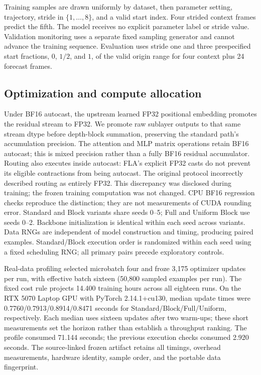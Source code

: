 Training samples are drawn uniformly by dataset, then parameter setting, trajectory, stride in $\{1,\ldots,8\}$, and a valid start index. Four strided context frames predict the fifth. The model receives no explicit parameter label or stride value. Validation monitoring uses a separate fixed sampling generator and cannot advance the training sequence. Evaluation uses stride one and three prespecified start fractions, $0$, $1/2$, and $1$, of the valid origin range for four context plus 24 forecast frames.

\subsection{Optimization and compute allocation}
Under BF16 autocast, the upstream learned FP32 positional embedding promotes the residual stream to FP32. We promote raw sublayer outputs to that same stream dtype before depth-block summation, preserving the standard path's accumulation precision. The attention and MLP matrix operations retain BF16 autocast; this is mixed precision rather than a fully BF16 residual accumulator. Routing also executes inside autocast: FLA's explicit FP32 casts do not prevent its eligible contractions from being autocast\cite{pytorchamp}. The original protocol incorrectly described routing as entirely FP32. This discrepancy was disclosed during training; the frozen training computation was not changed. CPU BF16 regression checks reproduce the distinction; they are not measurements of CUDA rounding error.
Standard and Block variants share seeds 0--5; Full and Uniform Block use seeds 0--2. Backbone initialization is identical within each seed across variants. Data RNGs are independent of model construction and timing, producing paired examples. Standard/Block execution order is randomized within each seed using a fixed scheduling RNG; all primary pairs precede exploratory controls.

Real-data profiling selected microbatch four and froze 3,175 optimizer updates per run, with effective batch sixteen (50,800 sampled examples per run). The fixed cost rule projects 14.400 training hours across all eighteen runs. On the RTX 5070 Laptop GPU with PyTorch 2.14.1+cu130, median update times were 0.7760/0.7913/0.8914/0.8471 seconds for Standard/Block/Full/Uniform, respectively. Each median uses sixteen updates after two warm-ups; these short measurements set the horizon rather than establish a throughput ranking. The profile consumed 71.144 seconds; the previous execution checks consumed 2.920 seconds. The source-linked frozen artifact retains all timings, overhead measurements, hardware identity, sample order, and the portable data fingerprint\cite{studycode}.

